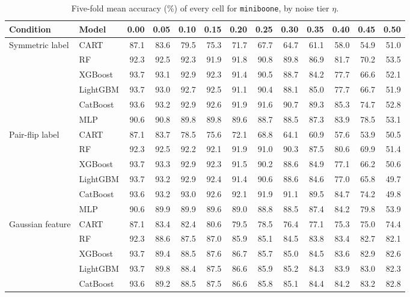 \begin{table}[p]
\centering
\tiny
\setlength{\tabcolsep}{2.6pt}
\caption{Five-fold mean accuracy (\%) of every cell for \texttt{miniboone}, by noise tier $\eta$.}
\label{tab:grid_miniboone}
\begin{tabular}{@{}llrrrrrrrrrrr@{}}
\toprule
Condition & Model & 0.00 & 0.05 & 0.10 & 0.15 & 0.20 & 0.25 & 0.30 & 0.35 & 0.40 & 0.45 & 0.50 \\
\midrule
Symmetric label & CART & 87.1 & 83.6 & 79.5 & 75.3 & 71.7 & 67.7 & 64.7 & 61.1 & 58.0 & 54.9 & 51.0 \\
 & RF & 92.3 & 92.5 & 92.3 & 91.9 & 91.8 & 90.8 & 89.8 & 86.9 & 81.7 & 70.2 & 53.5 \\
 & XGBoost & 93.7 & 93.1 & 92.9 & 92.3 & 91.4 & 90.5 & 88.7 & 84.2 & 77.7 & 66.6 & 52.1 \\
 & LightGBM & 93.7 & 93.0 & 92.7 & 92.5 & 91.1 & 90.4 & 88.1 & 85.0 & 77.7 & 66.7 & 51.9 \\
 & CatBoost & 93.6 & 93.2 & 92.9 & 92.6 & 91.9 & 91.6 & 90.7 & 89.3 & 85.3 & 74.7 & 52.8 \\
 & MLP & 90.6 & 90.8 & 89.8 & 89.8 & 89.6 & 88.7 & 88.5 & 87.3 & 83.9 & 78.5 & 53.1 \\
\midrule
Pair-flip label & CART & 87.1 & 83.7 & 78.5 & 75.6 & 72.1 & 68.8 & 64.1 & 60.9 & 57.6 & 53.9 & 50.5 \\
 & RF & 92.3 & 92.5 & 92.2 & 92.1 & 91.9 & 91.0 & 90.3 & 87.5 & 80.6 & 69.9 & 51.4 \\
 & XGBoost & 93.7 & 93.3 & 92.9 & 92.3 & 91.5 & 90.2 & 88.6 & 84.9 & 77.1 & 66.2 & 50.6 \\
 & LightGBM & 93.7 & 93.2 & 92.9 & 92.4 & 91.4 & 90.6 & 88.6 & 84.6 & 77.0 & 65.8 & 49.7 \\
 & CatBoost & 93.6 & 93.2 & 93.0 & 92.6 & 92.1 & 91.9 & 91.1 & 89.5 & 84.7 & 74.2 & 49.8 \\
 & MLP & 90.6 & 89.9 & 89.9 & 89.6 & 89.0 & 88.8 & 88.5 & 87.4 & 84.2 & 79.8 & 53.9 \\
\midrule
Gaussian feature & CART & 87.1 & 83.4 & 82.4 & 80.6 & 79.5 & 78.5 & 76.4 & 77.1 & 75.3 & 75.0 & 74.4 \\
 & RF & 92.3 & 88.6 & 87.5 & 87.0 & 85.9 & 85.1 & 84.5 & 83.8 & 83.4 & 82.7 & 82.1 \\
 & XGBoost & 93.7 & 89.4 & 88.5 & 87.6 & 86.7 & 85.7 & 85.0 & 84.5 & 83.6 & 82.9 & 82.6 \\
 & LightGBM & 93.7 & 89.8 & 88.4 & 87.5 & 86.6 & 85.9 & 85.2 & 84.3 & 83.9 & 83.0 & 82.3 \\
 & CatBoost & 93.6 & 89.2 & 88.5 & 87.5 & 86.6 & 85.8 & 85.1 & 84.4 & 84.2 & 83.2 & 82.8 \\

\end{tabular}
\end{table}
